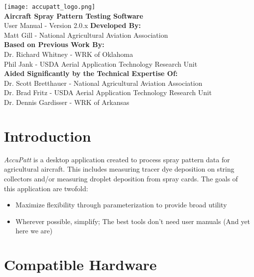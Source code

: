 \documentclass[10pt,letterpaper,titlepage]{article}
\author{Matt Gill}
\begin{document}
	\begin{titlepage}
		\begin{center}
			\vspace*{1cm}
            \texttt{[image: accupatt\_logo.png]}\\
			\vspace{0.5cm}
			\textbf{Aircraft Spray Pattern Testing Software}\\
			User Manual - Version 2.0.x
			\vfill
			\textbf{Developed By:}\\
			Matt Gill - National Agricultural Aviation Association\\
            \vspace{0.5cm}
			\textbf{Based on Previous Work By:}\\
			Dr. Richard Whitney - WRK of Oklahoma\\
			Phil Jank - USDA Aerial Application Technology Research Unit\\
            \vspace{0.5cm}
			\textbf{Aided Significantly by the Technical Expertise Of:}\\
			Dr. Scott Bretthauer - National Agricultural Aviation Association\\
            Dr. Brad Fritz - USDA Aerial Application Technology Research Unit\\
            Dr. Dennis Gardisser - WRK of Arkansas\\
		\end{center}
	\end{titlepage}
	\tableofcontents
	\newpage
	
    \section{Introduction}
	\textit{AccuPatt} is a desktop application created to process spray pattern data for agricultural aircraft. This includes measuring tracer dye deposition on string collectors and/or measuring droplet deposition from spray cards. The goals of this application are twofold:
    \begin{itemize}
        \item Maximize flexibility through parameterization to provide broad utility
        \item Wherever possible, simplify; The best tools don't need user manuals (And yet here we are)
    \end{itemize}

    \newpage

    \section{Compatible Hardware}
\end{document}

